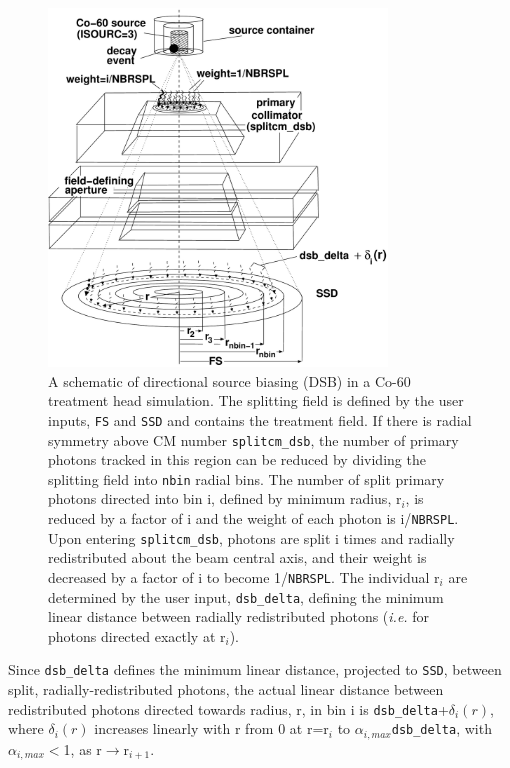 \documentclass[12pt,twoside]{article}
\begin{document}
\clearpage
{}
\begin{figure}[H]
\begin{center}
\includegraphics[width=9cm]{figures/dsb}
\end{center}
\caption[Schematic of DSB]
{A schematic of directional source biasing (DSB) in a Co-60 treatment head simulation.
The splitting field is
defined by the user inputs, {\tt FS} and
{\tt SSD} and contains the treatment field.  If there is radial symmetry
above CM number {\tt splitcm\_dsb}, the number of primary photons tracked in
this region can be reduced by dividing the splitting field into {\tt nbin} radial bins.
The number of split primary photons directed into bin i, defined by minimum radius, r$_i$, is
reduced by a factor of i and the weight of each photon is i/{\tt NBRSPL}.  Upon
entering {\tt splitcm\_dsb}, photons are split i times and radially redistributed about the
beam central axis, and their weight is decreased by a factor of i to become 1/{\tt NBRSPL}.
The individual r$_i$ are determined by the user input, {\tt dsb\_delta}, defining
the minimum linear distance between radially redistributed photons ({\em i.e.} for
photons directed exactly at r$_i$).}
\label{dsb_fig}
\end{figure}

Since {\tt dsb\_delta} defines the minimum linear distance, projected to {\tt SSD}, between split, radially-redistributed photons, the actual linear distance between redistributed photons directed towards radius, r, in bin i is
{\tt dsb\_delta}+$\delta_i(r)$, where $\delta_i(r)$ increases linearly with r from 0 at r=r$_i$ to
$\alpha_{i,max}${\tt dsb\_delta}, with $\alpha_{i,max}<$1, as r$\rightarrow$r$_{i+1}$.
\end{document}
